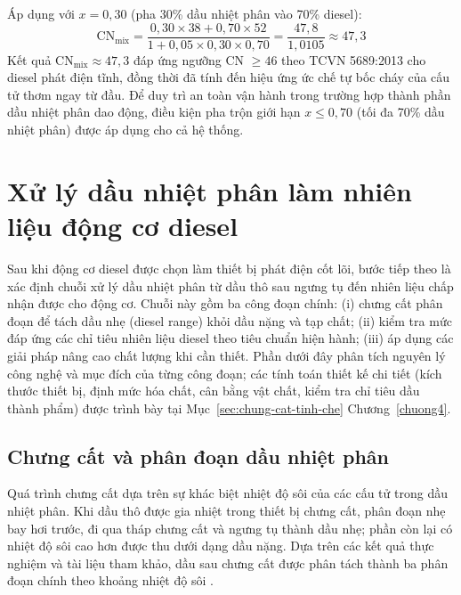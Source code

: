 \documentclass[../main.tex]{subfiles}
\begin{document}
Áp dụng với $x = 0{,}30$ (pha 30\% dầu nhiệt phân vào 70\% diesel):
\begin{equation}
\text{CN}_{\text{mix}} = \frac{0{,}30 \times 38 + 0{,}70 \times 52}{1 + 0{,}05 \times 0{,}30 \times 0{,}70}
= \frac{47{,}8}{1{,}0105} \approx 47{,}3
\end{equation}
Kết quả $\text{CN}_{\text{mix}} \approx 47{,}3$ đáp ứng ngưỡng CN $\geq 46$ theo TCVN 5689:2013 cho diesel phát điện tĩnh, đồng thời đã tính đến hiệu ứng ức chế tự bốc cháy của cấu tử thơm ngay từ đầu. Để duy trì an toàn vận hành trong trường hợp thành phần dầu nhiệt phân dao động, điều kiện pha trộn giới hạn $x \leq 0{,}70$ (tối đa 70\% dầu nhiệt phân) được áp dụng cho cả hệ thống.

\section{Xử lý dầu nhiệt phân làm nhiên liệu động cơ diesel}
\label{sec:xu-ly-dau-nhiet-phan}

Sau khi động cơ diesel được chọn làm thiết bị phát điện cốt lõi, bước tiếp theo là xác định chuỗi xử lý dầu nhiệt phân từ dầu thô sau ngưng tụ đến nhiên liệu chấp nhận được cho động cơ. Chuỗi này gồm ba công đoạn chính: (i) chưng cất phân đoạn để tách dầu nhẹ (diesel range) khỏi dầu nặng và tạp chất; (ii) kiểm tra mức đáp ứng các chỉ tiêu nhiên liệu diesel theo tiêu chuẩn hiện hành; (iii) áp dụng các giải pháp nâng cao chất lượng khi cần thiết. Phần dưới đây phân tích nguyên lý công nghệ và mục đích của từng công đoạn; các tính toán thiết kế chi tiết (kích thước thiết bị, định mức hóa chất, cân bằng vật chất, kiểm tra chỉ tiêu dầu thành phẩm) được trình bày tại Mục~\ref{sec:chung-cat-tinh-che} Chương~\ref{chuong4}.

\subsection{Chưng cất và phân đoạn dầu nhiệt phân}

Quá trình chưng cất dựa trên sự khác biệt nhiệt độ sôi của các cấu tử trong dầu nhiệt phân. Khi dầu thô được gia nhiệt trong thiết bị chưng cất, phân đoạn nhẹ bay hơi trước, đi qua tháp chưng cất và ngưng tụ thành dầu nhẹ; phần còn lại có nhiệt độ sôi cao hơn được thu dưới dạng dầu nặng. Dựa trên các kết quả thực nghiệm và tài liệu tham khảo, dầu sau chưng cất được phân tách thành ba phân đoạn chính theo khoảng nhiệt độ sôi \cite{Sharuddin2016,Miandad2016}.
\end{document}
